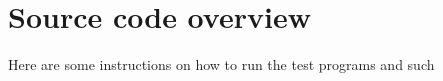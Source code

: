\documentclass[main.tex]{subfiles}
\begin{document}
\section{Source code overview}
\label{a_sec:source_code_overview}
Here are some instructions on how to run the test programs and such
\biblio
\end{document}
